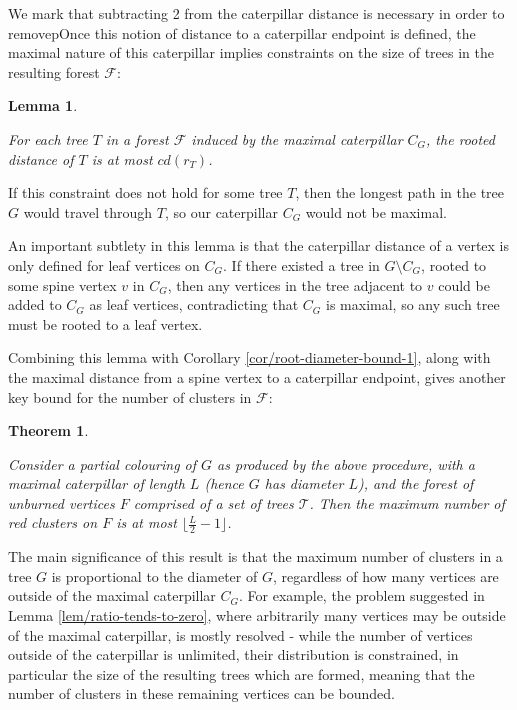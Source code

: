 \documentclass{mpaper}
\newtheorem{theorem}{Theorem}[section]
\newtheorem{lemma}{Lemma}[section]
\begin{document}
We mark that subtracting 2 from the caterpillar distance is necessary in order to removepOnce this notion of distance to a caterpillar endpoint is defined, the maximal nature of this caterpillar implies constraints on the size of trees in the resulting forest $\mathcal{F}$:

\begin{lemma}
\label{def/tree-size-constraint}

For each tree $T$ in a forest $\mathcal{F}$ induced by the maximal caterpillar $C_G$, the rooted distance of $T$ is at most $cd(r_T)$.

\end{lemma}

If this constraint does not hold for some tree $T$, then the longest path in the tree $G$ would travel through $T$, so our caterpillar $C_G$ would not be maximal.

An important subtlety in this lemma is that the caterpillar distance of a vertex is only defined for leaf vertices on $C_G$. If there existed a tree in $G \setminus C_G$, rooted to some spine vertex $v$ in $C_G$, then any vertices in the tree adjacent to $v$ could be added to $C_G$ as leaf vertices, contradicting that $C_G$ is maximal, so any such tree must be rooted to a leaf vertex.

Combining this lemma with Corollary \ref{cor/root-diameter-bound-1}, along with the maximal distance from a spine vertex to a caterpillar endpoint, gives another key bound for the number of clusters in $\mathcal{F}$:

\begin{theorem}
\label{thm/root-diameter-bound-2}

Consider a partial colouring of $G$ as produced by the above procedure, with a maximal caterpillar of length $L$ (hence $G$ has diameter $L$), and the forest of unburned vertices $F$ comprised of a set of trees $\mathcal{T}$. Then the maximum number of red clusters on $F$ is at most $\lfloor \frac{L}{2} - 1 \rfloor$.

\end{theorem}

The main significance of this result is that the maximum number of clusters in a tree $G$ is proportional to the diameter of $G$, regardless of how many vertices are outside of the maximal caterpillar $C_G$. For example, the problem suggested in Lemma \ref{lem/ratio-tends-to-zero}, where arbitrarily many vertices may be outside of the maximal caterpillar, is mostly resolved - while the number of vertices outside of the caterpillar is unlimited, their distribution is constrained, in particular the size of the resulting trees which are formed, meaning that the number of clusters in these remaining vertices can be bounded.
\end{document}
